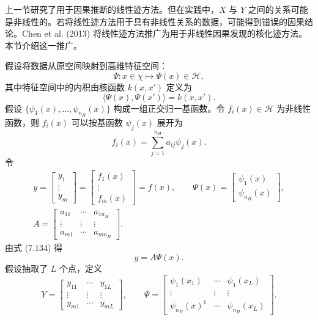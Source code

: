 上一节研究了用于因果推断的线性迹方法。但在实践中，$X$ 与 $Y$ 之间的关系可能是非线性的。若将线性迹方法用于具有非线性关系的数据，可能得到错误的因果结论。Chen et al. (2013) 将线性迹方法推广为用于非线性因果发现的核化迹方法。本节介绍这一推广。

假设将数据从原空间映射到高维特征空间：
\[
\Psi:x\in\chi\mapsto\Psi(x)\in\mathcal H,
\]
其中特征空间中的内积由核函数 $k(x,x')$ 定义为
\[
\langle\Psi(x),\Psi(x')\rangle=k(x,x').
\]
假设 $\{\psi_1(x),\ldots,\psi_{n_H}(x)\}$ 构成一组正交归一基函数。令 $f_i(x)\in\mathcal H$ 为非线性函数，则 $f_i(x)$ 可以按基函数 $\psi_j(x)$ 展开为
\begin{equation}
f_i(x)=\sum_{j=1}^{n_H}a_{ij}\psi_j(x).
\tag{7.134}
\end{equation}
令
\[
\begin{gathered}
y=\begin{bmatrix}y_1\\\vdots\\y_m\end{bmatrix}
=\begin{bmatrix}f_1(x)\\\vdots\\f_m(x)\end{bmatrix}=f(x),\qquad
\Psi(x)=\begin{bmatrix}\psi_1(x)\\\psi_{n_H}(x)\end{bmatrix},\\
A=\begin{bmatrix}a_{11}&\cdots&a_{1n_H}\\\vdots&\vdots&\vdots\\a_{m1}&\cdots&a_{mn_H}\end{bmatrix}.
\end{gathered}
\]
由式 (7.134) 得
\begin{equation}
y=A\Psi(x).
\tag{7.135}
\end{equation}
假设抽取了 $L$ 个点，定义
\[
Y=\begin{bmatrix}y_{11}&\cdots&y_{1L}\\\vdots&\vdots&\vdots\\y_{m1}&\cdots&y_{mL}\end{bmatrix},\qquad
\Psi=\begin{bmatrix}\psi_1(x_1)&\cdots&\psi_1(x_L)\\\vdots&\vdots&\vdots\\\psi_{n_H}(x)^1&\cdots&\psi_{n_H}(x_L)\end{bmatrix}.
\]
